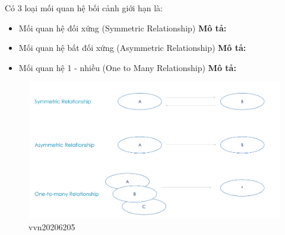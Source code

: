Có 3 loại mối quan hệ bối cảnh giới hạn là:

\begin{itemize}
    \item Mối quan hệ đối xứng (Symmetric Relationship)
          \textbf{Mô tả:} 

    \item Mối quan hệ bất đối xứng (Asymmetric Relationship)
          \textbf{Mô tả:} 

    \item Mối quan hệ 1 - nhiều (One to Many Relationship)
          \textbf{Mô tả:} 

\end{itemize}

% 
\begin{figure}[H]

      \centering
      
      \includegraphics[scale = 0.5]{pictures/cac_moi_quan_he_boi_canh_gioi_han/main.png}
      
      \caption{vvn20206205}
      
      \end{figure}
      